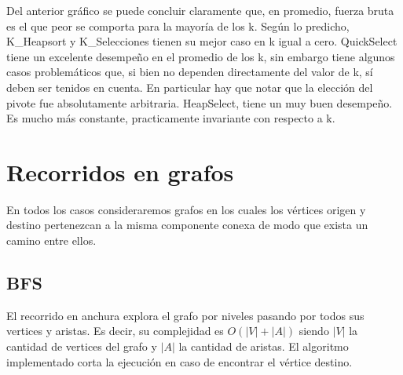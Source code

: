 \documentclass[a4paper,10pt]{article}
\begin{document}
Del anterior gráfico se puede concluir claramente que, en promedio, fuerza bruta es el que peor se comporta para la mayoría de los k. Según lo predicho, K\_Heapsort y K\_Selecciones tienen su mejor caso en k igual a cero. QuickSelect tiene un excelente desempeño en el promedio de los k, sin embargo tiene algunos casos problemáticos que, si bien no dependen directamente del valor de k, sí deben ser tenidos en cuenta. En particular hay que notar que la elección del pivote fue absolutamente arbitraria. HeapSelect, tiene un muy buen desempeño. Es mucho más constante, practicamente invariante con respecto a k. 

\section{Recorridos en grafos}

En todos los casos consideraremos grafos en los cuales los vértices origen y destino pertenezcan a la misma componente conexa de modo que exista un camino entre ellos.

\subsection{BFS}

El recorrido en anchura explora el grafo por niveles pasando por todos sus vertices y aristas. Es decir, su complejidad es $O(|V| + |A|)$ siendo $|V|$ la cantidad de vertices del grafo y $|A|$ la cantidad de aristas. El algoritmo implementado corta la ejecución en caso de encontrar el vértice destino.
\end{document}
